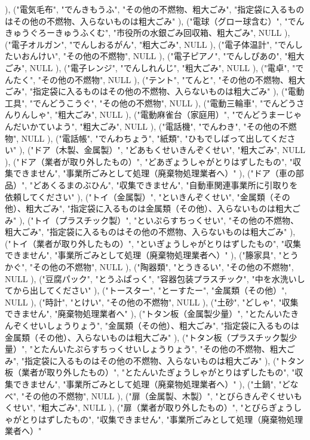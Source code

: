 ), ("電気毛布", "でんきもうふ", "その他の不燃物、粗大ごみ", "指定袋に入るものはその他の不燃物、入らないものは粗大ごみ"
), ("電球（グロー球含む）", "でんきゅうぐろーきゅうふくむ", "市役所の水銀ごみ回収箱、粗大ごみ", NULL
), ("電子オルガン", "でんしおるがん", "粗大ごみ", NULL
), ("電子体温計", "でんしたいおんけい", "その他の不燃物", NULL
), ("電子ピアノ", "でんしぴあの", "粗大ごみ", NULL
), ("電子レンジ", "でんしれんじ", "粗大ごみ", NULL
), ("電卓", "でんたく", "その他の不燃物", NULL
), ("テント", "てんと", "その他の不燃物、粗大ごみ", "指定袋に入るものはその他の不燃物、入らないものは粗大ごみ"
), ("電動工具", "でんどうこうぐ", "その他の不燃物", NULL
), ("電動三輪車", "でんどうさんりんしゃ", "粗大ごみ", NULL
), ("電動麻雀台（家庭用）", "でんどうまーじゃんだいかていよう", "粗大ごみ", NULL
), ("電話機", "でんわき", "その他の不燃物", NULL
), ("電話帳", "でんわちょう", "紙類", "ひもでしばって出してください"
), ("ドア（木製、金属製）", "どあもくせいきんぞくせい", "粗大ごみ", NULL
), ("ドア（業者が取り外したもの）", "どあぎょうしゃがとりはずしたもの", "収集できません", "事業所ごみとして処理（廃棄物処理業者へ）"
), ("ドア（車の部品）", "どあくるまのぶひん", "収集できません", "自動車関連事業所に引取りを依頼してください"
), ("トイ（金属製）", "といきんぞくせい", "金属類（その他）、粗大ごみ", "指定袋に入るものは金属類（その他）、入らないものは粗大ごみ"
), ("トイ（プラスチック製）", "といぷらすちっくせい", "その他の不燃物、粗大ごみ", "指定袋に入るものはその他の不燃物、入らないものは粗大ごみ"
), ("トイ（業者が取り外したもの）", "といぎょうしゃがとりはずしたもの", "収集できません", "事業所ごみとして処理（廃棄物処理業者へ）"
), ("籐家具", "とうかぐ", "その他の不燃物", NULL
), ("陶器類", "とうきるい", "その他の不燃物", NULL
), ("豆腐パック", "とうふぱっく", "容器包装プラスチック", "中を水洗いしてから出してください"
), ("トースター", "とーすたー", "金属類（その他）", NULL
), ("時計", "とけい", "その他の不燃物", NULL
), ("土砂", "どしゃ", "収集できません", "廃棄物処理業者へ"
), ("トタン板（金属製少量）", "とたんいたきんぞくせいしょうりょう", "金属類（その他）、粗大ごみ", "指定袋に入るものは金属類（その他）、入らないものは粗大ごみ"
), ("トタン板（プラスチック製少量）", "とたんいたぷらすちっくせいしょうりょう", "その他の不燃物、粗大ごみ", "指定袋に入るものはその他の不燃物、入らないものは粗大ごみ"
), ("トタン板（業者が取り外したもの）", "とたんいたぎょうしゃがとりはずしたもの", "収集できません", "事業所ごみとして処理（廃棄物処理業者へ）"
), ("土鍋", "どなべ", "その他の不燃物", NULL
), ("扉（金属製、木製）", "とびらきんぞくせいもくせい", "粗大ごみ", NULL
), ("扉（業者が取り外したもの）", "とびらぎょうしゃがとりはずしたもの", "収集できません", "事業所ごみとして処理（廃棄物処理業者へ）"
